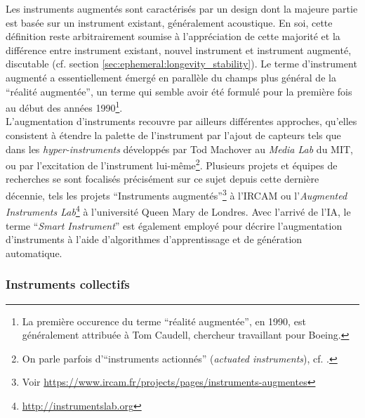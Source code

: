 \noindent Les instruments augmentés sont caractérisés par un design dont la majeure partie est basée sur un instrument existant, généralement acoustique. En soi, cette définition reste arbitrairement soumise à l'appréciation de cette majorité et la différence entre instrument existant, nouvel instrument et instrument augmenté, discutable (cf. section \ref{sec:ephemeral:longevity_stability}). Le terme d'instrument augmenté a essentiellement émergé en parallèle du champs plus général de la ``réalité augmentée'', un terme qui semble avoir été formulé pour la première fois au début des années 1990\footnote{La première occurence du terme ``réalité augmentée'', en 1990, est généralement attribuée à Tom Caudell, chercheur travaillant pour Boeing.}.\\
\indent L'augmentation d'instruments recouvre par ailleurs différentes approches, qu'elles consistent à étendre la palette de l'instrument par l'ajout de capteurs tels que dans les \textit{hyper-instruments} \cite{machover_hyperinstruments_1991} développés par Tod Machover au \textit{Media Lab} du \gls{MIT}, ou par l'excitation de l'instrument lui-même\footnote{On parle parfois d'``instruments actionnés'' (\textit{actuated instruments}), cf. \cite{overholt_advancements_2011}.}. Plusieurs projets et équipes de recherches se sont focalisés précisément sur ce sujet depuis cette dernière décennie, tels les projets ``Instruments augmentés''\footnote{Voir \url{https://www.ircam.fr/projects/pages/instruments-augmentes}} à l'\gls{IRCAM} ou l'\textit{Augmented Instruments Lab}\footnote{\url{http://instrumentslab.org}} à l'université Queen Mary de Londres. Avec l'arrivé de l'\gls{IA}, le terme ``\textit{Smart Instrument}'' est également employé pour décrire l'augmentation d'instruments à l'aide d'algorithmes d'apprentissage et de génération automatique.\\



\subsubsection{Instruments collectifs}
\label{sec:ephemeral:origins:collectiveDMIs}

